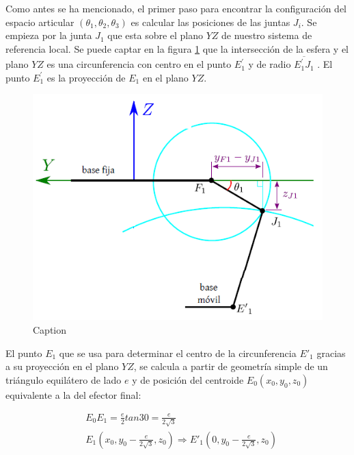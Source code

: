         Como antes se ha mencionado, el primer paso para encontrar la configuración del espacio articular  $\left(  \theta _{1}, \theta _{2}, \theta _{3} \right)  $ es calcular las posiciones de las juntas $J_{i}$. Se empieza por la junta  $J_{1}$ que esta sobre el plano $YZ$ de nuestro sistema de referencia local. Se puede captar en la figura \ref{fig:ANEXO_MA_C_POS_5} que la intersección de la esfera y el plano $YZ$ es una circunferencia con centro en el punto $E^{'}_{1}$ y de radio $\overline{E^{'}_{1}J_{1}}$ . El punto $E^{'}_{1}$ es la proyección de  $E_{1}$  en el plano $YZ$.
        
        \begin{figure}[htb]
            \centering
            \includegraphics[width=0.9\linewidth]{Main/Chapter4/Images4/DIBUJOA11.png}
            \caption{Caption}
            \label{fig:ANEXO_MA_C_POS_5}
        \end{figure}
     
     \newpage

        El punto  $E_{1}$  que se usa para determinar el centro de la circunferencia $E'_{1}$  gracias a su proyección en el plano $YZ$, se calcula a partir de geometría simple de un triángulo equilátero de lado $e$ y de posición del centroide  $E_{0} \left( x_{0},y_{0},z_{0} \right)$  equivalente a la del efector final:
        
        \vspace{-1em}
        \begin{align*}
            &E_0E_1=\frac{e}{2}tan30=\frac{e}{2\sqrt{3}}\\
            &E_{1} \left( x_{0},y_{0}-\frac{e}{2\sqrt{3}},z_{0} \right) \Longrightarrow E'_{1} \left( 0,y_{0}-\frac{e}{2\sqrt{3}},z_{0} \right)
        \end{align*}


